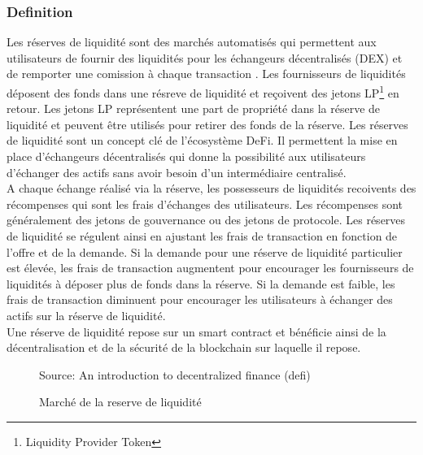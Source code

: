 
\subsubsection{Definition}
Les réserves de liquidité sont des marchés automatisés qui permettent aux utilisateurs de fournir des liquidités pour les échangeurs décentralisés (DEX) et de 
remporter une comission à chaque transaction \cite{jensen2021introduction, belchior2022survey, augustin2022yield}. 
Les fournisseurs de liquidités déposent des fonds dans une résreve de liquidité et reçoivent des jetons 
LP\footnote{Liquidity Provider Token} en retour. Les jetons LP représentent une part de propriété dans la réserve de liquidité et peuvent être utilisés pour 
retirer des fonds de la réserve. Les réserves de liquidité sont un concept clé de l’écosystème DeFi. Il permettent la mise en place d'échangeurs décentralisés 
qui donne la possibilité aux utilisateurs d’échanger des actifs sans avoir besoin d’un intermédiaire centralisé. \\
A chaque échange réalisé via la réserve, les possesseurs de liquidités recoivents des récompenses qui sont les frais d'échanges des utilisateurs. Les récompenses 
sont généralement des jetons de gouvernance ou des jetons de protocole. Les réserves de liquidité se régulent ainsi en ajustant les frais de transaction 
en fonction de l’offre et de la demande. Si la demande pour une réserve de liquidité particulier est élevée, les frais de transaction augmentent pour encourager 
les fournisseurs de liquidités à déposer plus de fonds dans la réserve. Si la demande est faible, les frais de transaction diminuent pour encourager les 
utilisateurs à échanger des actifs sur la réserve de liquidité. \\
Une réserve de liquidité repose sur un smart contract et bénéficie ainsi de la décentralisation et de la sécurité de la \gls{blockchain} sur laquelle il repose.
\begin{figure}[h!]
    \centering
    {\scriptsize Source: An introduction to decentralized finance (defi) \cite{jensen2021introduction} }
    \caption{Marché de la reserve de liquidité}
    \label{fig:liquidite}
\end{figure}

